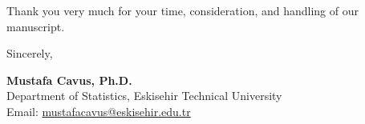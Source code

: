 \documentclass[10.5pt,a4paper]{article}
\begin{document}
Thank you very much for your time, consideration, and handling of our manuscript.

\vspace{0.3cm}
Sincerely,

\textbf{Mustafa Cavus, Ph.D.} \\
Department of Statistics, Eskisehir Technical University \\
Email: \href{mailto:mustafacavus@eskisehir.edu.tr}{mustafacavus@eskisehir.edu.tr}
\end{document}
